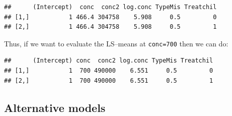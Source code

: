 \documentclass[
]{article}
\newenvironment{Shaded}{\begin{snugshade}}{\end{snugshade}}
\newcommand{\AttributeTok}[1]{\textcolor[rgb]{0.77,0.63,0.00}{#1}}
\newcommand{\DecValTok}[1]{\textcolor[rgb]{0.00,0.00,0.81}{#1}}
\newcommand{\FunctionTok}[1]{\textcolor[rgb]{0.00,0.00,0.00}{#1}}
\newcommand{\NormalTok}[1]{#1}
\newcommand{\OtherTok}[1]{\textcolor[rgb]{0.56,0.35,0.01}{#1}}
\newcommand{\SpecialCharTok}[1]{\textcolor[rgb]{0.00,0.00,0.00}{#1}}
\newcommand{\StringTok}[1]{\textcolor[rgb]{0.31,0.60,0.02}{#1}}
\begin{document}
\begin{Shaded}
\end{Shaded}

\begin{verbatim}
##      (Intercept)  conc  conc2 log.conc TypeMis Treatchil
## [1,]           1 466.4 304758    5.908     0.5         0
## [2,]           1 466.4 304758    5.908     0.5         1
\end{verbatim}

Thus, if we want to evaluate the LS--means at \texttt{conc=700} then we
can do:

\begin{Shaded}
\end{Shaded}

\begin{verbatim}
##      (Intercept) conc  conc2 log.conc TypeMis Treatchil
## [1,]           1  700 490000    6.551     0.5         0
## [2,]           1  700 490000    6.551     0.5         1
\end{verbatim}

\hypertarget{alternative-models}{%
\subsection{Alternative models}\label{alternative-models}}
\end{document}
